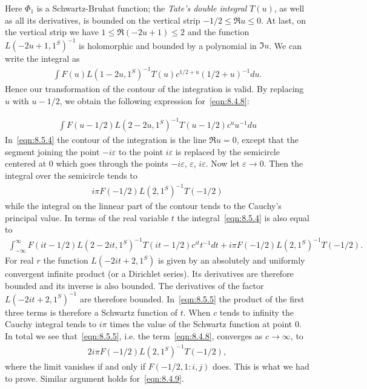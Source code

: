 Here $\Phi_1$ is a Schwartz-Bruhat function; the \emph{Tate's double integral} $T(u)$, as well as all its derivatives, is bounded on the vertical strip $-1/2 \le \Re u \le 0$.
At last, on the vertical strip we have $1\leq \Re(-2u+1) \leq 2$ and the function $L(-2u+1, 1^S)^{-1}$ is holomorphic and bounded by a polynomial in $\Im u$.
We can write the integral as
\begin{align*}
    \int F(u)L(1-2u, 1^{S})^{-1} T(u) c^{1/2+u} (1/2+u)^{-1} du.
\end{align*}
Hence our transformation of the contour of the integration is valid.
By replacing $u$ with $u-1/2$, we obtain the following expression for~\eqref{eqn:8.4.8}:

\begin{align}
    \label{eqn:8.5.4}
    \int F(u-1/2) L(2-2u, 1^{S})^{-1} T(u-1/2) c^{u} u^{-1}du
\end{align}
In~\eqref{eqn:8.5.4} the contour of the integration is the line $\Re u = 0$,
except that the segment joining the point $-i\varepsilon$ to the point $i\varepsilon$ is replaced by the semicircle centered at 0 which goes through the points $-i\varepsilon$, $\varepsilon$, $i\varepsilon$.
Now let $\varepsilon \to 0$.
Then the integral over the semicircle tends to
\begin{align*}
    i\pi F(-1/2) L(2, 1^{S})^{-1} T(-1/2)
\end{align*}
while the integral on the linnear part of the contour tends to the Cauchy's principal value.
In terms of the real variable $t$ the integral~\eqref{eqn:8.5.4} is also equal to
\begin{align}
    \label{eqn:8.5.5}
    \int_{-\infty}^{\infty} F(it-1/2)L(2-2it, 1^{S})^{-1} T(it-1/2)c^{it}t^{-1}dt + i\pi F(-1/2)L(2, 1^{S})^{-1} T(-1/2).
\end{align}
For real $r$ the function $L(-2it+2, 1^S)$ is given by an absolutely and uniformly convergent infinite product (or a Dirichlet series).
Its derivatives are therefore bounded and its inverse is also bounded.
The derivatives of the factor $L(-2it+2, 1^S)^{-1}$ are therefore bounded.
In~\eqref{eqn:8.5.5} the product of the first three terms is therefore a Schwartz function of $t$.
When $c$ tends to infinity the Cauchy integral tends to $i\pi$ times the value of the Schwartz function at point 0.
In total we see that~\eqref{eqn:8.5.5}, i.e. the term~\eqref{eqn:8.4.8}, converges as $c \to \infty$, to
\begin{align*}
    2i \pi F(-1/2)L(2, 1^S)^{-1} T(-1/2),
\end{align*}
where the limit vanishes if and only if $F(-1/2, 1: i, j)$ does.
This is what we had to prove.
Similar argument holds for~\eqref{eqn:8.4.9}.


